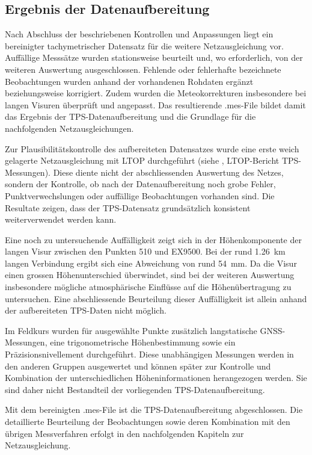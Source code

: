 \subsection{Ergebnis der Datenaufbereitung}
\label{sec:ergebnis_der_datenaufbereitung}

Nach Abschluss der beschriebenen Kontrollen und Anpassungen liegt ein
bereinigter tachymetrischer Datensatz für die weitere Netzausgleichung
vor. Auffällige Messsätze wurden stationsweise beurteilt und, wo
erforderlich, von der weiteren Auswertung ausgeschlossen. Fehlende oder
fehlerhafte bezeichnete Beobachtungen wurden anhand der vorhandenen
Rohdaten ergänzt beziehungsweise korrigiert. Zudem wurden die
Meteokorrekturen insbesondere bei langen Visuren überprüft und
angepasst. Das resultierende .mes-File bildet damit das
Ergebnis der TPS-Datenaufbereitung und die Grundlage für die
nachfolgenden Netzausgleichungen.

Zur Plausibilitätskontrolle des aufbereiteten Datensatzes wurde eine
erste weich gelagerte Netzausgleichung mit LTOP durchgeführt (siehe , LTOP-Bericht TPS-Messungen). Diese
diente nicht der abschliessenden Auswertung des Netzes, sondern der
Kontrolle, ob nach der Datenaufbereitung noch grobe Fehler,
Punktverwechslungen oder auffällige Beobachtungen vorhanden sind.
Die Resultate zeigen, dass der TPS-Datensatz grundsätzlich konsistent
weiterverwendet werden kann.

Eine noch zu untersuchende Auffälligkeit zeigt sich in der
Höhenkomponente der langen Visur zwischen den Punkten 510 und EX9500. Bei der rund
1.26~km langen Verbindung ergibt sich eine Abweichung von rund 54~mm.
Da die Visur einen grossen Höhenunterschied überwindet, sind bei der
weiteren Auswertung insbesondere mögliche atmosphärische Einflüsse auf
die Höhenübertragung zu untersuchen. Eine abschliessende Beurteilung
dieser Auffälligkeit ist allein anhand der aufbereiteten TPS-Daten 
nicht möglich.

Im Feldkurs wurden für ausgewählte Punkte zusätzlich langstatische
GNSS-Messungen, eine trigonometrische Höhenbestimmung sowie ein
Präzisionsnivellement durchgeführt. Diese unabhängigen Messungen werden
in den anderen Gruppen ausgewertet und können später zur Kontrolle
und Kombination der unterschiedlichen Höheninformationen herangezogen
werden. Sie sind daher nicht Bestandteil der vorliegenden
TPS-Datenaufbereitung.

Mit dem bereinigten .mes-File ist die TPS-Datenaufbereitung
abgeschlossen. Die detaillierte Beurteilung der Beobachtungen sowie
deren Kombination mit den übrigen Messverfahren erfolgt in den
nachfolgenden Kapiteln zur Netzausgleichung.
